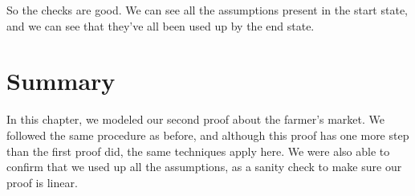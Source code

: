 \documentclass[../../../main.tex]{subfiles}
\begin{document}
\noindent
So the checks are good. We can see all the assumptions present in the start state, and we can see that they've all been used up by the end state.


\section{Summary}

In this chapter, we modeled our second proof about the farmer's market. We followed the same procedure as before, and although this proof has one more step than the first proof did, the same techniques apply here. We were also able to confirm that we used up all the assumptions, as a sanity check to make sure our proof is linear.
\end{document}
